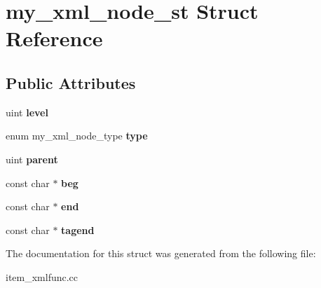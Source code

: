 \hypertarget{structmy__xml__node__st}{}\section{my\+\_\+xml\+\_\+node\+\_\+st Struct Reference}
\label{structmy__xml__node__st}
\subsection*{Public Attributes}
\begin{DoxyCompactItemize}
\item 
\mbox{\label{structmy__xml__node__st_ad4d2a753acf456961b6be45697f9c42c}} 
uint {\bfseries level}
\item 
\mbox{\label{structmy__xml__node__st_aefcf2914d1ec8e2801453c20c0119cdc}} 
enum my\+\_\+xml\+\_\+node\+\_\+type {\bfseries type}
\item 
\mbox{\label{structmy__xml__node__st_ad8b23864bd9aafc0db11b1a0ab0cfa3c}} 
uint {\bfseries parent}
\item 
\mbox{\label{structmy__xml__node__st_ad0af8ed29c7abba33e2e02d9f4c0e610}} 
const char $\ast$ {\bfseries beg}
\item 
\mbox{\label{structmy__xml__node__st_a70608ea1a99bbb891a2c2abd9d5b7443}} 
const char $\ast$ {\bfseries end}
\item 
\mbox{\label{structmy__xml__node__st_a1981574595e1a3c9054c93183f5bdd5a}} 
const char $\ast$ {\bfseries tagend}
\end{DoxyCompactItemize}


The documentation for this struct was generated from the following file\+:\begin{DoxyCompactItemize}
\item 
item\+\_\+xmlfunc.\+cc\end{DoxyCompactItemize}
